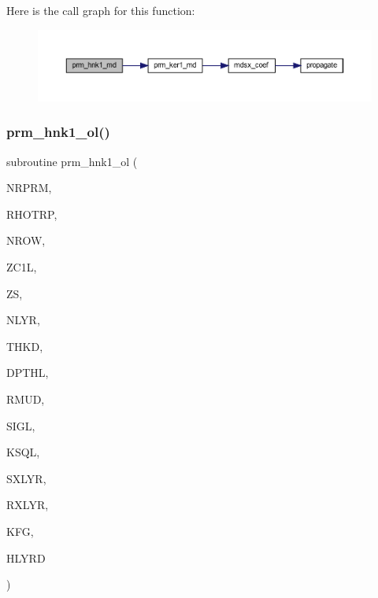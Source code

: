 Here is the call graph for this function\+:\nopagebreak
\begin{figure}[H]
\begin{center}
\leavevmode
\includegraphics[width=350pt]{Leroi__c_8f90_a90b2b96ee9e9153503bfd5d5bf7d1d0e_cgraph}
\end{center}
\end{figure}
\mbox{\label{Leroi__c_8f90_addd341d907a00b743326c01025f01020}} 
\subsubsection{\texorpdfstring{prm\+\_\+hnk1\+\_\+ol()}{prm\_hnk1\_ol()}}
{\footnotesize\ttfamily subroutine prm\+\_\+hnk1\+\_\+ol (\begin{DoxyParamCaption}\item[{integer}]{N\+R\+P\+RM,  }\item[{real, dimension(nrprm)}]{R\+H\+O\+T\+RP,  }\item[{integer}]{N\+R\+OW,  }\item[{real, dimension(nrow)}]{Z\+C1L,  }\item[{real(kind=ql)}]{ZS,  }\item[{integer}]{N\+L\+YR,  }\item[{real(kind=ql), dimension (nlyr)}]{T\+H\+KD,  }\item[{real(kind=ql), dimension (nlyr)}]{D\+P\+T\+HL,  }\item[{real(kind=ql), dimension(0\+:nlyr)}]{R\+M\+UD,  }\item[{complex(kind=ql), dimension (nlyr)}]{S\+I\+GL,  }\item[{complex(kind=ql), dimension (nlyr)}]{K\+S\+QL,  }\item[{integer}]{S\+X\+L\+YR,  }\item[{integer}]{R\+X\+L\+YR,  }\item[{integer}]{K\+FG,  }\item[{complex(kind=ql), dimension(nrprm,3,nrow)}]{H\+L\+Y\+RD }\end{DoxyParamCaption})}

